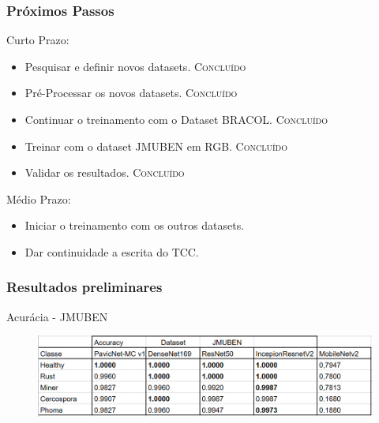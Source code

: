 \documentclass[aspectratio=169]{beamer}
\begin{document}
\begin{frame}
    \frametitle{Próximos Passos}

    \begin{block}{Curto Prazo:}

        \begin{itemize}
            \item Pesquisar e definir novos datasets. \textsc{Concluído}
            \item Pré-Processar os novos datasets. \textsc{Concluído}
            \item Continuar o treinamento com o Dataset BRACOL.  \textsc{Concluído}
            \item Treinar com o dataset JMUBEN em RGB. \textsc{Concluído}
            \item Validar os resultados. \textsc{Concluído}
        \end{itemize}

    \end{block}



    \begin{block}{Médio Prazo:}

        \begin{itemize}
            \item \color{blue} Iniciar o treinamento com os outros datasets.
            \item \color{blue} Dar continuidade a escrita do TCC.
        \end{itemize}

    \end{block}




\end{frame}









\begin{frame}
    \frametitle{Resultados preliminares}

    \centering
    Acurácia - JMUBEN

    \begin{figure}
        \centering
        \includegraphics[scale = 0.7]{img/jmubenAcc.png}
        \label{fig:enter-label}
    \end{figure}



\end{frame}
\end{document}
